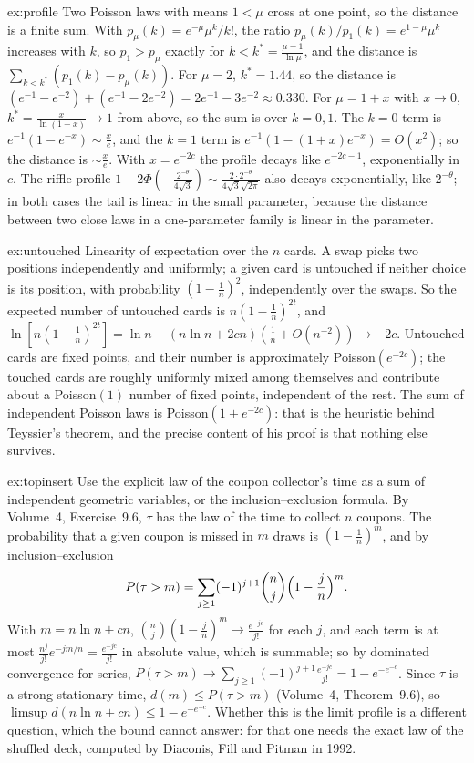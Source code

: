 \begin{solution}{ex:profile}
\idea Two Poisson laws with means $1<\mu$ cross at one point, so the distance is a finite sum.
\writeup With $p_\mu(k)=e^{-\mu}\mu^k/k!$, the ratio $p_\mu(k)/p_1(k)=e^{1-\mu}\mu^k$ increases with $k$, so $p_1>p_\mu$ exactly for $k<k^*=\frac{\mu-1}{\ln\mu}$, and the distance is $\sum_{k<k^*}(p_1(k)-p_\mu(k))$. For
$\mu=2$, $k^*=1.44$, so the distance is $(e^{-1}-e^{-2})+(e^{-1}-2e^{-2})=2e^{-1}-3e^{-2}\approx0.330$. For $\mu=1+x$ with $x\to0$, $k^*=\frac x{\ln(1+x)}\to1$ from above, so the sum is over $k=0,1$. The $k=0$ term is $e^{-1}(1-e^{-x})\sim\frac xe$, and the $k=1$ term is
$e^{-1}(1-(1+x)e^{-x})=O(x^2)$; so the distance is $\sim\frac xe$. With
$x=e^{-2c}$ the profile decays like $e^{-2c-1}$, exponentially in $c$. The riffle profile $1-2\Phi(-\frac{2^{-\theta}}{4\sqrt3})\sim\frac{2\cdot2^{-\theta}}{4\sqrt3\sqrt{2\pi}}$ also decays exponentially, like $2^{-\theta}$; in both cases the tail is linear in the
small parameter, because the distance between two close laws in a one-parameter family is linear in the parameter.
\end{solution}

\begin{solution}{ex:untouched}
\idea Linearity of expectation over the $n$ cards.
\writeup A swap picks two positions independently and uniformly; a given card is untouched if neither choice is its position, with probability $(1-\frac1n)^2$, independently over the
swaps. So the expected number of untouched cards is $n(1-\frac1n)^{2t}$, and $\ln[n(1-\frac1n)^{2t}]=\ln n-(n\ln n+2cn)(\frac1n+O(n^{-2}))\to-2c$. Untouched cards are fixed points, and their number is
approximately Poisson$(e^{-2c})$; the touched cards are roughly uniformly mixed among themselves and contribute about a Poisson$(1)$ number of fixed points, independent of the
rest. The sum of independent Poisson laws is Poisson$(1+e^{-2c})$: that is the heuristic behind Teyssier's theorem, and the precise content of his proof is that nothing else survives.
\end{solution}

\begin{solution}{ex:topinsert}
\idea Use the explicit law of the coupon collector's time as a sum of independent geometric variables, or the inclusion--exclusion formula.
\writeup By Volume~4, Exercise~9.6, $\tau$ has the law of the time to collect $n$ coupons. The probability that a given coupon is missed in $m$ draws is $(1-\frac1n)^m$, and by inclusion--exclusion
\[
P(\tau>m)=\sum_{j\ge1}(-1)^{j+1}\binom nj\Bigl(1-\frac jn\Bigr)^m.
\]
With $m=n\ln n+cn$, $\binom nj(1-\frac jn)^m\to\frac{e^{-jc}}{j!}$ for each $j$, and each term is at most $\frac{n^j}{j!}e^{-jm/n}=\frac{e^{-jc}}{j!}$ in absolute value, which is summable; so by dominated convergence for series,
$P(\tau>m)\to\sum_{j\ge1}(-1)^{j+1}\frac{e^{-jc}}{j!}=1-e^{-e^{-c}}$. Since $\tau$ is a strong stationary time, $d(m)\le P(\tau>m)$ (Volume~4, Theorem~9.6), so $\limsup d(n\ln n+cn)\le1-e^{-e^{-c}}$. Whether this
is the limit profile is a different question, which the bound cannot answer: for that one needs the exact law of the shuffled deck, computed by Diaconis, Fill and Pitman in 1992.
\end{solution}

